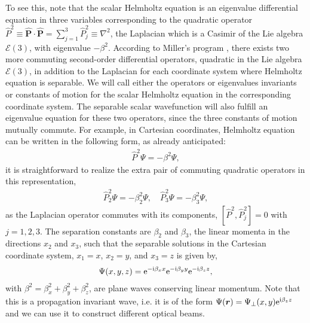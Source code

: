 \documentclass[12pt]{iopart}
\begin{document}
To see this, note that the scalar Helmholtz equation is an eigenvalue differential equation in three variables corresponding to the quadratic operator $\hat{P}^2 \equiv \hat{\bm{P}} \cdot \hat{\bm{P}} = \sum_{j=1}^{3} \hat{P}_{j}^2 \equiv \nabla^2$, the Laplacian which is a Casimir of the Lie algebra $\mathcal{E}(3)$, with eigenvalue $- \beta^2$.
According to Miller's program \cite{Boyer1976p35,Miller1984},  there exists two more commuting second-order differential operators, quadratic in the Lie algebra $\mathcal{E}(3)$, in addition to the Laplacian for each coordinate system where Helmholtz equation is separable.
We will call either the operators or eigenvalues invariants  or constants of motion for the scalar Helmholtz equation in the corresponding coordinate system.
The separable scalar wavefunction will also fulfill an eigenvalue equation for these two operators, since the three constants of motion mutually commute.
For example, in Cartesian coordinates, Helmholtz equation can be written in the following form, as already anticipated:
\begin{eqnarray}
\hat{P}^2 \Psi = - \beta^2  \Psi,
\end{eqnarray}
it is straightforward to realize the extra pair of commuting quadratic operators in this representation,
\begin{eqnarray}
\hat{P}_{2}^2 \Psi = - \beta_{2}^2  \Psi, \quad \hat{P}_{3}^2 \Psi = - \beta_{3}^2  \Psi,
\end{eqnarray}
as the Laplacian operator commutes with its components, $\left[ \hat{P}^{2}, \hat{P}_{j}^2 \right] = 0$ with $j=1,2,3$.
The separation constants are $\beta_{2}$ and $\beta_{3}$, the linear  momenta in the directions $x_{2}$ and $x_{3}$, such that the separable solutions in the Cartesian coordinate system,  $x_{1}=x$, $x_{2}=y$, and $x_{3}=z$ is given by,
\begin{eqnarray}\label{cartesian}
\Psi(x,y,z) = {\rm e}^{-{\rm i} \beta_{x} x} {\rm e}^{-{\rm i} \beta_{y} y} {\rm e}^{-{\rm i} \beta_{z} z},
\end{eqnarray}
with $\beta^2 = \beta_{x}^2 + \beta_{y}^2 + \beta_{z}^2$, are plane waves conserving linear momentum.
Note that this is a propagation invariant wave, i.e. it is of the form  $\Psi(\bm{r}) = \Psi_{\perp}(x,y) {\rm e}^{{\rm i} \beta_{z} z}$ and we can use it to construct different optical beams.
\end{document}
